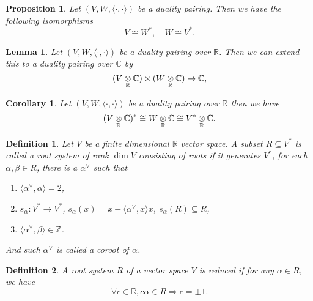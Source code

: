 \documentclass{article}
\newtheorem{proposition}{Proposition}[section]
\newtheorem{definition}{Definition}[section]
\newtheorem{lemma}{Lemma}[section]
\newtheorem{corollary}{Corollary}[section]
\numberwithin{equation}{section}
\newcommand{\tens}[1]{%
  \mathbin{\mathop{\otimes}\displaylimits_{#1}}%
}
\begin{document}
\begin{proposition}
Let $(V,W,\langle\cdot,\cdot\rangle)$ be a duality pairing. Then we have the following isomorphisms
\begin{equation*}
V\cong W^*,\quad W\cong V^*.
\end{equation*}
\end{proposition}

\begin{lemma}
Let $(V,W,\langle\cdot,\cdot\rangle)$ be a duality pairing over $\mathbb{R}$. Then we can extend this to a duality pairing over $\mathbb{C}$ by
\begin{equation*}
(V\tens{\mathbb{R}}\mathbb{C})\times (W\tens{\mathbb{R}}\mathbb{C})\to\mathbb{C},
\end{equation*}
\end{lemma}

\begin{corollary}
Let $(V,W,\langle\cdot,\cdot\rangle)$ be a duality pairing over $\mathbb{R}$ then we have
\begin{equation*}
(V\tens{\mathbb{R}}\mathbb{C})^*\cong W\tens{\mathbb{R}}\mathbb{C}\cong V^*\tens{\mathbb{R}}\mathbb{C}.
\end{equation*}
\end{corollary}

\begin{definition}
Let $V$ be a finite dimensional $\mathbb{R}$ vector space. A subset $R\subseteq V^*$ is called a root system of rank $\dim V$ consisting of roots if it generates $V^*$, for each $\alpha,\beta\in R$, there is a $\alpha^\lor$ such that
\begin{enumerate}
\item $\langle\alpha^\lor,\alpha\rangle = 2$,
\item $s_\alpha:V^*\to V^*$, $s_\alpha(x) = x-\langle\alpha^\lor,x\rangle x$, $s_\alpha(R)\subseteq R$,
\item $\langle\alpha^\lor,\beta\rangle\in\mathbb{Z}$.
\end{enumerate}
And such $\alpha^\lor$ is called a coroot of $\alpha$.
\end{definition}

\begin{definition}
A root system $R$ of a vector space $V$ is reduced if for any $\alpha\in R$, we have
\begin{equation*}
\forall c\in\mathbb{R}, c\alpha\in R\Rightarrow c = \pm1.
\end{equation*}
\end{definition}
\end{document}
